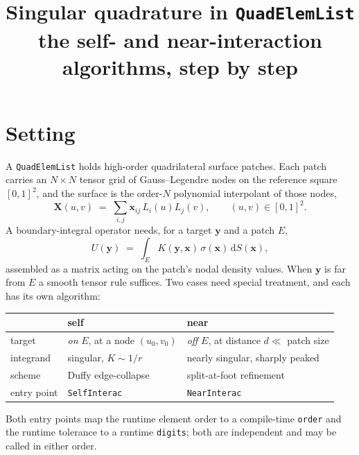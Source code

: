\documentclass[11pt]{article}
\title{Singular quadrature in \texttt{QuadElemList}\\[2pt]
       \large the self- and near-interaction algorithms, step by step}
\author{}
\date{}
\begin{document}
\maketitle
\vspace{-3.5em}

\section{Setting}

A \texttt{QuadElemList} holds high-order quadrilateral surface patches. Each patch carries an
$N\times N$ tensor grid of Gauss--Legendre nodes on the reference square $[0,1]^2$, and the
surface is the order-$N$ polynomial interpolant of those nodes,
\[
  \mathbf{X}(u,v) \;=\; \sum_{i,j} \mathbf{x}_{ij}\, L_i(u) L_j(v),
  \qquad (u,v)\in[0,1]^2 .
\]
A boundary-integral operator needs, for a target $\mathbf{y}$ and a patch $E$,
\[
  U(\mathbf{y}) \;=\; \int_E K(\mathbf{y},\mathbf{x})\,\sigma(\mathbf{x})\,\mathrm{d}S(\mathbf{x}),
\]
assembled as a matrix acting on the patch's nodal density values. When $\mathbf{y}$ is far from
$E$ a smooth tensor rule suffices. Two cases need special treatment, and each has its own
algorithm:

\begin{center}
\begin{minipage}{\textwidth}\centering
\begin{tabular}{@{}lll@{}}
\toprule
 & \textbf{self} & \textbf{near} \\
\midrule
target & \emph{on} $E$, at a node $(u_0,v_0)$ & \emph{off} $E$, at distance $d\ll$ patch size \\
integrand & singular, $K\sim 1/r$ & nearly singular, sharply peaked \\
scheme & Duffy edge-collapse & split-at-foot refinement \\
entry point & \texttt{SelfInterac} & \texttt{NearInterac} \\
\bottomrule
\end{tabular}
\end{minipage}
\end{center}

Both entry points map the runtime element order to a compile-time \texttt{order} and the runtime
tolerance to a runtime \texttt{digits}; both are independent and may be called in either order.
\end{document}
